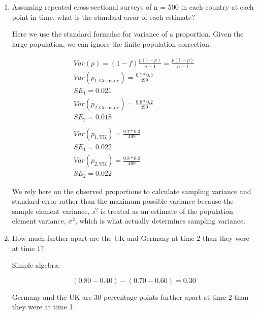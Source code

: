 \documentclass[a4paper]{exam}
\begin{document}
\begin{enumerate}
	\begin{enumerate}
	\item Assuming repeated cross-sectional surveys of n = 500 in each country at each point in time, what is the standard error of each estimate?
	
	\begin{solution}
	
	Here we use the standard formulae for variance of a proportion. Given the large population, we can ignore the finite population correction.
	
	\begin{align*}
	Var(p) = (1-f)\frac{p(1-p)}{n-1} = \frac{p(1-p)}{n-1}\\
	Var(p_{1,\text{Germany}}) = \frac{0.7*0.3}{499}\\
	SE_1 = 0.021\\
	Var(p_{2,\text{Germany}}) = \frac{0.8*0.2}{499}\\
	SE_2 = 0.018\\
	 \\
	Var(p_{1,\text{UK}}) = \frac{0.7*0.3}{499}\\
	SE_1 = 0.022\\
	Var(p_{2,\text{UK}}) = \frac{0.8*0.2}{499}\\
	SE_2 = 0.022
	\end{align*}
	
	We rely here on the observed proportions to calculate sampling variance and standard error rather than the maximum possible variance because the sample element variance, $s^2$ is treated as an estimate of the population element variance, $\sigma^2$, which is what actually determines sampling variance.
	
	\end{solution}
	
	\item How much farther apart are the UK and Germany at time 2 than they were at time 1?
	
	\begin{solution}
	
	Simple algebra:
	
	\begin{equation}
	(0.80 - 0.40) - (0.70 - 0.60) = 0.30
	\end{equation}
	
	Germany and the UK are 30 percentage points further apart at time 2 than they were at time 1.
	
	\end{solution}
	

\end{enumerate}
\end{enumerate}
\end{document}
